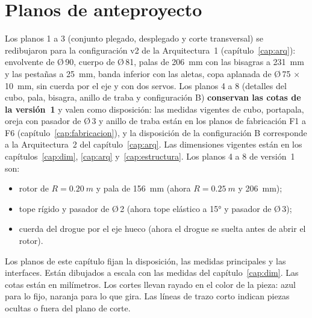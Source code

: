 \chapter{Planos de anteproyecto}\label{cap:planos}

\begin{nota}
Los planos 1 a 3 (conjunto plegado, desplegado y corte transversal) se redibujaron para la
configuración v2 de la Arquitectura~1 (capítulo~\ref{cap:arq}): envolvente de Ø\,90, cuerpo de Ø\,81,
palas de \SI{206}{mm} con las bisagras a \SI{231}{mm} y las pestañas a \SI{25}{mm}, banda inferior con las
aletas, copa aplanada de Ø\,75 $\times$ \SI{10}{mm}, sin cuerda por el eje y con dos servos. Los planos 4 a 8
(detalles del cubo, pala, bisagra, anillo de traba y configuración B) \textbf{conservan las cotas de la versión~1}
y valen como disposición: las medidas vigentes de cubo, portapala, oreja con pasador de Ø\,3 y anillo de traba
están en los planos de fabricación F1 a F6 (capítulo~\ref{cap:fabricacion}), y la disposición de la configuración B
corresponde a la Arquitectura~2 del capítulo~\ref{cap:arq}. Las dimensiones vigentes están en los
capítulos~\ref{cap:dim}, \ref{cap:arq} y~\ref{cap:estructura}. Los planos 4 a 8 de versión~1 son:
\begin{itemize}[leftmargin=*,nosep]
  \item rotor de $R=\SI{0.20}{m}$ y pala de \SI{156}{mm} (ahora $R=\SI{0.25}{m}$ y \SI{206}{mm});
  \item tope rígido y pasador de Ø\,2 (ahora tope elástico a \ang{+15} y pasador de Ø\,3);
  \item cuerda del drogue por el eje hueco (ahora el drogue se suelta antes de abrir el rotor).
\end{itemize}
\end{nota}

Los planos de este capítulo fijan la disposición, las medidas principales y las
interfaces. Están dibujados a escala con las medidas del capítulo~\ref{cap:dim}. Las
cotas están en milímetros. Los cortes llevan rayado en el color de la pieza: azul para lo
fijo, naranja para lo que gira. Las líneas de trazo corto indican piezas ocultas o fuera
del plano de corte.

\newcommand{\secF}[2]{\filldraw[fijo] #1 rectangle #2;
  \fill[pattern=north east lines, pattern color=cfijo!80] #1 rectangle #2;}
\newcommand{\secR}[2]{\filldraw[rot] #1 rectangle #2;
  \fill[pattern=north west lines, pattern color=crot!80] #1 rectangle #2;}
\newcommand{\secC}[2]{\filldraw[cont] #1 rectangle #2;
  \fill[pattern=north east lines, pattern color=ccont!80] #1 rectangle #2;}
\newcommand{\call}[3]{\draw[ref] #1 -- (#2); \node[marca] at (#2) {#3};}

